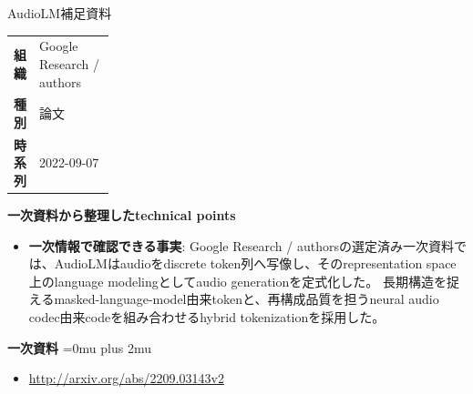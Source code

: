 \begin{technicalnote}{AudioLM}{補足資料}
\begingroup
\begin{tabularx}{\linewidth}{@{}>{\bfseries}p{0.22\linewidth}X@{}}
組織 & Google Research / authors \\
種別 & 論文 \\
時系列 & 2022-09-07 \\
\end{tabularx}
\smallskip
{\bfseries 一次資料から整理したtechnical points}
\begin{itemize}[leftmargin=1.5em,itemsep=0.35em]
\item \textbf{一次情報で確認できる事実}: Google Research / authorsの選定済み一次資料では、AudioLMはaudioをdiscrete token列へ写像し、そのrepresentation space上のlanguage modelingとしてaudio generationを定式化した。 長期構造を捉えるmasked-language-model由来tokenと、再構成品質を担うneural audio codec由来codeを組み合わせるhybrid tokenizationを採用した。
\end{itemize}
\begin{minipage}{\linewidth}
\begin{samepage}
{\bfseries 一次資料}
\begingroup\sloppy
\Urlmuskip=0mu plus 2mu\relax
\begin{itemize}[leftmargin=1.5em,itemsep=0.25em]
\item {\scriptsize\url{http://arxiv.org/abs/2209.03143v2}}
\end{itemize}
\endgroup
\end{samepage}
\end{minipage}
\endgroup
\end{technicalnote}
\medskip

